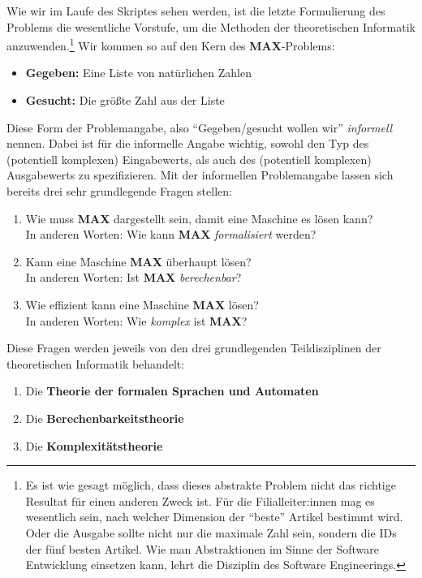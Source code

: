 Wie wir im Laufe des Skriptes sehen werden, ist die letzte Formulierung des Problems die 
wesentliche Vorstufe, um die Methoden der theoretischen Informatik anzuwenden.\footnote{
Es ist wie gesagt möglich,
dass dieses abstrakte Problem nicht das richtige Resultat für einen anderen Zweck ist.
Für die Filialleiter:innen mag es wesentlich sein,
nach welcher Dimension der ``beste'' Artikel bestimmt wird.
Oder die Ausgabe sollte nicht nur die maximale Zahl sein, sondern die IDs der
fünf besten Artikel.
Wie man Abstraktionen im Sinne der Software Entwicklung einsetzen kann,
lehrt die Disziplin des Software Engineerings.}
Wir kommen so auf den Kern des \textbf{MAX}-Problems:
\begin{itemize}
    \item \textbf{Gegeben:} Eine Liste von natürlichen Zahlen
    \item \textbf{Gesucht:} Die größte Zahl aus der Liste
\end{itemize}
Diese Form der Problemangabe, also ``Gegeben/gesucht wollen wir'' \emph{informell} nennen.
Dabei ist für die informelle Angabe wichtig,
sowohl den Typ des (potentiell komplexen) Eingabewerts,
als auch des (potentiell komplexen) Ausgabewerts zu spezifizieren.
Mit der informellen Problemangabe lassen sich bereits drei sehr grundlegende Fragen stellen:
\begin{enumerate}
    \item Wie muss \textbf{MAX} dargestellt sein, damit eine Maschine es lösen kann?\\ 
        In anderen Worten: Wie kann \textbf{MAX} \emph{formalisiert} werden? 
    \item Kann eine Maschine \textbf{MAX} überhaupt lösen?\\
        In anderen Worten: Ist \textbf{MAX} \emph{berechenbar}?  
    \item Wie effizient kann eine Maschine \textbf{MAX} lösen?\\
        In anderen Worten: Wie \emph{komplex} ist \textbf{MAX}?
\end{enumerate}
Diese Fragen werden jeweils von den drei grundlegenden Teildisziplinen
der theoretischen Informatik behandelt:
\begin{enumerate}
    \item Die \textbf{Theorie der formalen Sprachen und Automaten}
    \item Die \textbf{Berechenbarkeitstheorie}
    \item Die \textbf{Komplexitätstheorie}
\end{enumerate}

